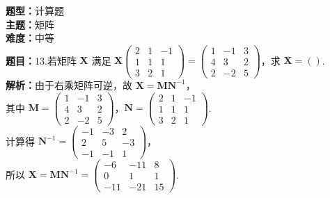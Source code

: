 \documentclass{ctexart}
\newenvironment{question}[5]{%
	\noindent\textbf{题型：}#1\\
	\textbf{主题：}#2\\
	\textbf{难度：}#3\\
	\textbf{题目：}#4\\
	\textbf{解析：}#5\\
	\vspace{1em}
}{}
\begin{document}
	\begin{question}
		{计算题}
		{矩阵}
		{中等}
		{13.若矩阵 \(\mathbf{X}\) 满足 \(\mathbf{X} \left(\begin{array}{ccc}2 & 1 & -1 \\ 1 & 1 & 1 \\ 3 & 2 & 1\end{array}\right) = \left(\begin{array}{ccc}1 & -1 & 3 \\ 4 & 3 & 2 \\ 2 & -2 & 5\end{array}\right)\)，求 \(\mathbf{X} = ()\). }
		{由于右乘矩阵可逆，故 \(\mathbf{X} = \mathbf{M} \mathbf{N}^{-1}\)，\\
			其中 \(\mathbf{M} = \left(\begin{array}{ccc}1 & -1 & 3 \\ 4 & 3 & 2 \\ 2 & -2 & 5\end{array}\right)\)，\(\mathbf{N} = \left(\begin{array}{ccc}2 & 1 & -1 \\ 1 & 1 & 1 \\ 3 & 2 & 1\end{array}\right)\). \\
			计算得 \(\mathbf{N}^{-1} = \left(\begin{array}{ccc}-1 & -3 & 2 \\ 2 & 5 & -3 \\ -1 & -1 & 1\end{array}\right)\)，\\
			所以 \(\mathbf{X} = \mathbf{M}\mathbf{N}^{-1} = \left(\begin{array}{ccc}-6 & -11 & 8 \\ 0 & 1 & 1 \\ -11 & -21 & 15\end{array}\right)\). }
	\end{question}
	
\end{document}
